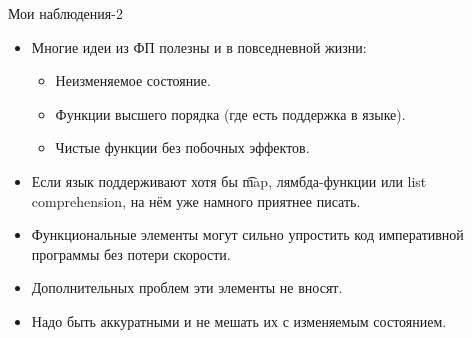 \begin{frame}{Мои наблюдения-2}
	\begin{itemize}
		\item Многие идеи из ФП полезны и в повседневной жизни:
			\begin{itemize}
				\item Неизменяемое состояние.
				\item Функции высшего порядка (где есть поддержка в языке).
				\item Чистые функции без побочных эффектов.
			\end{itemize}
		\item Если язык поддерживают хотя бы \t{map}, лямбда-функции или list comprehension,
			на нём уже намного приятнее писать.
		\item Функциональные элементы могут сильно упростить код императивной программы без потери скорости.
		\item Дополнительных проблем эти элементы не вносят.
		\item Надо быть аккуратными и не мешать их с изменяемым состоянием.
	\end{itemize}
\end{frame}
